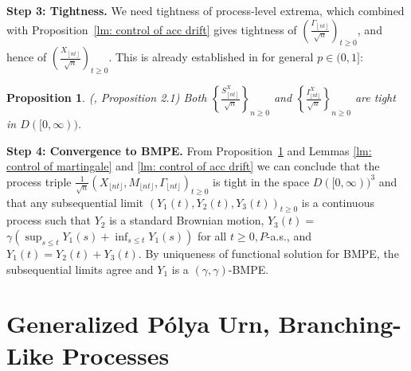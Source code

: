 \documentclass[twoside,12pt,a4paper]{article}
\newtheorem{proposition}{Proposition}[section]
\numberwithin{equation}{section}
\newcommand\TBD{\textcolor{red}{TBD.}}
\newcommand{\edt}[1]{\textcolor{red}{#1}} %
\begin{document}
	
	
	\textbf{Step 3: Tightness.} We need tightness of process-level extrema, which combined with Proposition~\ref{lm: control of acc drift} gives tightness of $\left(\frac{\Gamma_{\left\lfloor nt  \right\rfloor}}{\sqrt{n} }\right)_{t \ge 0}$, and hence of $\left(\frac{X_{\left\lfloor nt  \right\rfloor}}{\sqrt{n} }\right)_{t \ge 0}$. This is already established in \cite{KMP22} for general  $p \in (0,1]$:
	\begin{proposition}(\cite{KMP22}, Proposition 2.1)
		\label{prop: tightness}
		Both $\left\{\frac{S_{\left\lfloor n t \right\rfloor}^X}{\sqrt{n}}\right\}_{n \geq 0}$ and $\left\{\frac{I_{\lfloor n t \rfloor}^X}{\sqrt{n}}\right\}_{n \geq 0}$ are tight in $D([0, \infty))$.
	\end{proposition}
	
	\textbf{Step 4: Convergence to BMPE.} 
	From Proposition~\ref{prop: tightness} and Lemmas \ref{lm: control of martingale} and \ref{lm: control of acc drift} we can conclude that the process triple $\frac{1}{\sqrt{n}}\left(X_{\lfloor n t\rfloor}, M_{\lfloor n t\rfloor}, \Gamma_{\lfloor n t\rfloor}\right)_{t \geq 0}$ is tight in the space $D([0, \infty))^3$ and that any subsequential limit $\left(Y_1(t), Y_2(t), Y_3(t)\right)_{t \geq 0}$ is a continuous process such that $Y_2$ is a standard Brownian motion, $Y_3(t)=$ $\gamma\left(\sup _{s \leq t} Y_1(s)+\inf _{s \leq t} Y_1(s)\right)$ for all $t \geq 0, P$-a.s., and $Y_1(t)=Y_2(t)+Y_3(t)$. By uniqueness of functional solution for BMPE, the subsequential limits agree and $Y_1$ is a $(\gamma, \gamma)$-BMPE.

	\section{Generalized P\'{o}lya Urn, Branching-Like Processes}\label{sec: generalized Polya Urn, BLP}
\end{document}
